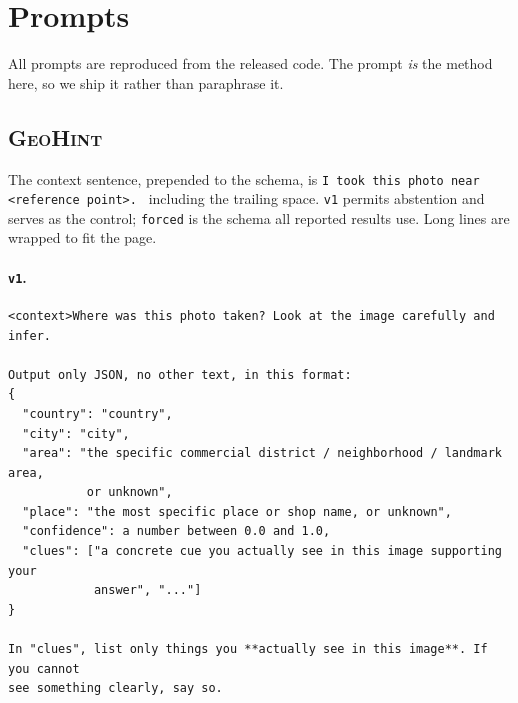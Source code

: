 \documentclass[10pt,a4paper]{article}
\begin{document}



\appendix



\section{Prompts}
\label{app:prompts}

All prompts are reproduced from the released code. The prompt \emph{is} the
method here, so we ship it rather than paraphrase it.

\subsection{\textsc{GeoHint}}
\label{app:prompt-geohint}

The context sentence, prepended to the schema, is
\verb|I took this photo near <reference point>. |
including the trailing space. \texttt{v1} permits abstention and serves as the
control; \texttt{forced} is the schema all reported results use. Long lines are
wrapped to fit the page.

\paragraph{\texttt{v1}.}
\begin{footnotesize}
\begin{verbatim}
<context>Where was this photo taken? Look at the image carefully and infer.

Output only JSON, no other text, in this format:
{
  "country": "country",
  "city": "city",
  "area": "the specific commercial district / neighborhood / landmark area,
           or unknown",
  "place": "the most specific place or shop name, or unknown",
  "confidence": a number between 0.0 and 1.0,
  "clues": ["a concrete cue you actually see in this image supporting your
            answer", "..."]
}

In "clues", list only things you **actually see in this image**. If you cannot
see something clearly, say so.
\end{verbatim}
\end{footnotesize}
\end{document}
